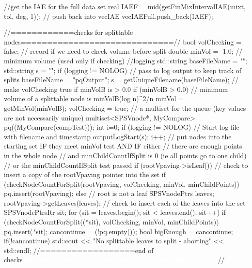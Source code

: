 \begin{DoxyCode}
{{      //get the IAE for the full data set
      real IAEF = mid(getFinMixIntervalIAE(mixt, tol, deg, 1));
      // push back into vecIAE 
      vecIAEFull.push_back(IAEF);

    //============checks  for splittable nodes=============================//
        bool volChecking = false; // record if we need to check volume before
       split
        double minVol = -1.0; // minimum volume (used only if checking)
        //logging
        std::string baseFileName = "";
        std::string s = "";
        if (logging != NOLOG) {
            // pass to log output to keep track of splits
            baseFileName = "pqOutput";
            s = getUniqueFilename(baseFileName);
        }
        // make volChecking true if minVolB is > 0.0
        if (minVolB > 0.0) {
            // minimum volume of a splittable node is minVolB(log n)^2/n
            minVol = getMinVol(minVolB);
            volChecking = true;
        }
      // a multiset for the queue (key values are not necessarily unique)
      multiset<SPSVnode*, MyCompare> pq((MyCompare(compTest)));
      int i=0;
      if (logging != NOLOG) {
             // Start log file with filename and timestamp
            outputLogStart(s);    
            i++;
      }
      // put nodes into the starting set IF they meet minVol test AND IF either
      // there are enough points in the whole node
      // and minChildCountIfSplit is 0 (ie all points go to one child)
      // or the minChildCountIfSplit test passed
        if (rootVpaving->isLeaf()) {
            // check to insert a copy of the rootVpaving pointer into the set
           if (checkNodeCountForSplit(rootVpaving, volChecking, minVol,
                minChildPoints)) {
                    pq.insert(rootVpaving);
            }
        }
        else { // root is not a leaf
            SPSVnodePtrs leaves;
            rootVpaving->getLeaves(leaves);
            // check to insert each of the leaves into the set
            SPSVnodePtrsItr sit;            
            for (sit = leaves.begin(); sit < leaves.end(); sit++) {
                if (checkNodeCountForSplit((*sit), volChecking, minVol,
                minChildPoints)) {
               pq.insert(*sit);
                }
            }
        }
        cancontinue = (!pq.empty());
        bool bigEnough = cancontinue;
        if(!cancontinue) {
            std::cout << "No splittable leaves to split - aborting" << 
      std::endl;
        }        
        //==================end of
       checks=====================================//
  
}}
\end{DoxyCode}
